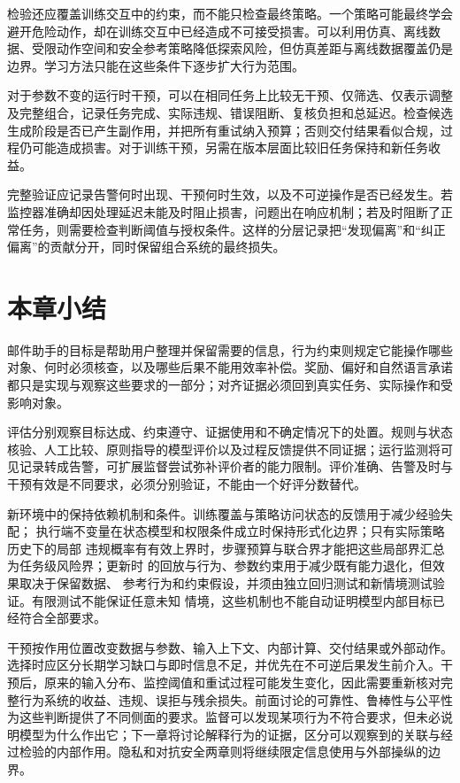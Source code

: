 检验还应覆盖训练交互中的约束，而不能只检查最终策略。一个策略可能最终学会避开危险动作，却在训练交互中已经造成不可接受损害。可以利用仿真、离线数据、受限动作空间和安全参考策略降低探索风险，但仿真差距与离线数据覆盖仍是边界。学习方法只能在这些条件下逐步扩大行为范围。

对于参数不变的运行时干预，可以在相同任务上比较无干预、仅筛选、仅表示调整及完整组合，记录任务完成、实际违规、错误阻断、复核负担和总延迟。检查候选生成阶段是否已产生副作用，并把所有重试纳入预算；否则交付结果看似合规，过程仍可能造成损害。对于训练干预，另需在版本层面比较旧任务保持和新任务收益。

完整验证应记录告警何时出现、干预何时生效，以及不可逆操作是否已经发生。若监控器准确却因处理延迟未能及时阻止损害，问题出在响应机制；若及时阻断了正常任务，则需要检查判断阈值与授权条件。这样的分层记录把“发现偏离”和“纠正偏离”的贡献分开，同时保留组合系统的最终损失。

\section{本章小结}
\label{sec:alignment-summary}

邮件助手的目标是帮助用户整理并保留需要的信息，行为约束则规定它能操作哪些对象、何时必须核查，以及哪些后果不能用效率补偿。奖励、偏好和自然语言承诺都只是实现与观察这些要求的一部分；对齐证据必须回到真实任务、实际操作和受影响对象。

评估分别观察目标达成、约束遵守、证据使用和不确定情况下的处置。规则与状态核验、人工比较、原则指导的模型评价以及过程反馈提供不同证据；运行监测将可见记录转成告警，可扩展监督尝试弥补评价者的能力限制。评价准确、告警及时与干预有效是不同要求，必须分别验证，不能由一个好评分数替代。

新环境中的保持依赖机制和条件。训练覆盖与策略访问状态的反馈用于减少经验失配；
执行端不变量在状态模型和权限条件成立时保持形式化边界；只有实际策略历史下的局部
违规概率有有效上界时，步骤预算与联合界才能把这些局部界汇总为任务级风险界；更新时
的回放与行为、参数约束用于减少既有能力退化，但效果取决于保留数据、
参考行为和约束假设，并须由独立回归测试和新情境测试验证。有限测试不能保证任意未知
情境，这些机制也不能自动证明模型内部目标已经符合全部要求。

干预按作用位置改变数据与参数、输入上下文、内部计算、交付结果或外部动作。选择时应区分长期学习缺口与即时信息不足，并优先在不可逆后果发生前介入。干预后，原来的输入分布、监控阈值和重试过程可能发生变化，因此需要重新核对完整行为系统的收益、违规、误拒与残余损失。前面讨论的可靠性、鲁棒性与公平性为这些判断提供了不同侧面的要求。监督可以发现某项行为不符合要求，但未必说明模型为什么作出它；下一章将讨论解释行为的证据，区分可以观察到的关联与经过检验的内部作用。隐私和对抗安全两章则将继续限定信息使用与外部操纵的边界。

